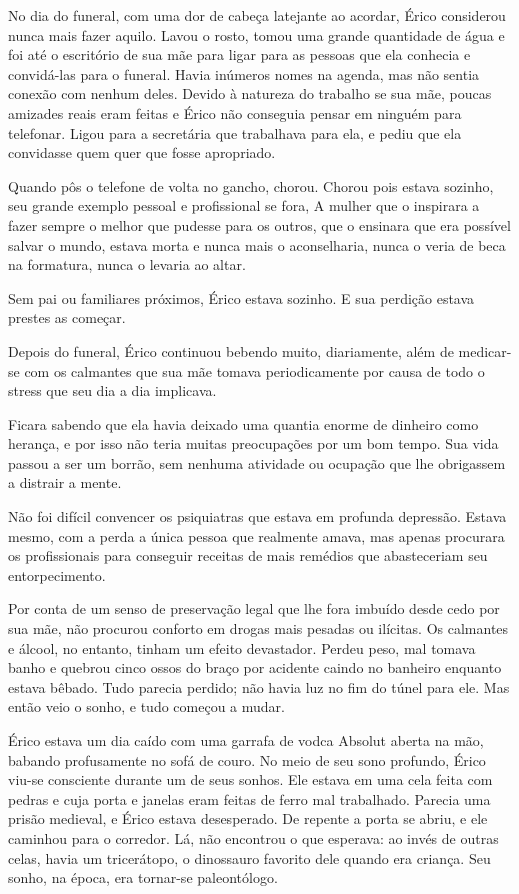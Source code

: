 No dia do funeral, com uma dor de cabeça latejante ao acordar, Érico
considerou nunca mais fazer aquilo. Lavou o rosto, tomou uma grande
quantidade de água e foi até o escritório de sua mãe para ligar para as
pessoas que ela conhecia e convidá-las para o funeral. Havia inúmeros
nomes na agenda, mas não sentia conexão com nenhum deles. Devido à
natureza do trabalho se sua mãe, poucas amizades reais eram feitas e
Érico não conseguia pensar em ninguém para telefonar. Ligou para a
secretária que trabalhava para ela, e pediu que ela convidasse quem quer
que fosse apropriado.

Quando pôs o telefone de volta no gancho, chorou. Chorou pois estava
sozinho, seu grande exemplo pessoal e profissional se fora, A mulher que
o inspirara a fazer sempre o melhor que pudesse para os outros, que o
ensinara que era possível salvar o mundo, estava morta e nunca mais o
aconselharia, nunca o veria de beca na formatura, nunca o levaria ao
altar.

Sem pai ou familiares próximos, Érico estava sozinho. E sua perdição
estava prestes as começar.

\espaco

Depois do funeral, Érico continuou bebendo muito, diariamente, além de
medicar-se com os calmantes que sua mãe tomava periodicamente por causa
de todo o stress que seu dia a dia implicava.

Ficara sabendo que ela havia deixado uma quantia enorme de dinheiro como
herança, e por isso não teria muitas preocupações por um bom tempo. Sua
vida passou a ser um borrão, sem nenhuma atividade ou ocupação que lhe
obrigassem a distrair a mente.

Não foi difícil convencer os psiquiatras que estava em profunda
depressão. Estava mesmo, com a perda a única pessoa que realmente amava,
mas apenas procurara os profissionais para conseguir receitas de mais
remédios que abasteceriam seu entorpecimento.

Por conta de um senso de preservação legal que lhe fora imbuído desde
cedo por sua mãe, não procurou conforto em drogas mais pesadas ou
ilícitas. Os calmantes e álcool, no entanto, tinham um efeito
devastador. Perdeu peso, mal tomava banho e quebrou cinco ossos do braço
por acidente caindo no banheiro enquanto estava bêbado. Tudo parecia
perdido; não havia luz no fim do túnel para ele. Mas então veio o sonho,
e tudo começou a mudar.

Érico estava um dia caído com uma garrafa de vodca Absolut aberta na
mão, babando profusamente no sofá de couro. No meio de seu sono
profundo, Érico viu-se consciente durante um de seus sonhos. Ele estava
em uma cela feita com pedras e cuja porta e janelas eram feitas de ferro
mal trabalhado. Parecia uma prisão medieval, e Érico estava desesperado.
De repente a porta se abriu, e ele caminhou para o corredor. Lá, não
encontrou o que esperava: ao invés de outras celas, havia um
tricerátopo, o dinossauro favorito dele quando era criança. Seu sonho,
na época, era tornar-se paleontólogo.

